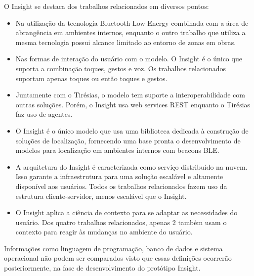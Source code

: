 \documentclass[english,brazilian]{UNISINOSmonografia}
\begin{document}
O Insight se destaca dos trabalhos relacionados em diversos pontos:
\begin{itemize}
	\item Na utilização da tecnologia Bluetooth Low Energy combinada com a área de abrangência em ambientes internos, enquanto o outro trabalho que utiliza a mesma tecnologia possui alcance limitado ao entorno de zonas em obras.

	\item Nas formas de interação do usuário com o modelo. O Insight é o único que suporta a combinação toques, gestos e voz. Os trabalhos relacionados suportam apenas toques ou então toques e gestos.

	\item Juntamente com o Tirésias, o modelo tem suporte a interoperabilidade com outras soluções. Porém, o Insight usa web services REST enquanto o Tirésias faz uso de agentes.

	\item O Insight é o único modelo que usa uma biblioteca dedicada à construção de soluções de localização, fornecendo uma base pronta o desenvolvimento de modelos para localização em ambientes internos com beacons BLE.

	\item A arquitetura do Insight é caracterizada como serviço distribuído na nuvem. Isso garante a infraestrutura para uma solução escalável e altamente disponível aos usuários. Todos os trabalhos relacionados fazem uso da estrutura cliente-servidor, menos escalável que o Insight.

	\item O Insight aplica a ciência de contexto para se adaptar as necessidades do usuário. Dos quatro trabalhos relacionados, apenas 2 também usam o contexto para reagir às mudanças no ambiente do usuário.
\end{itemize}

Informações como linguagem de programação, banco de dados e sistema operacional não podem ser comparados visto que essas definições ocorrerão posteriormente, na fase de desenvolvimento do protótipo Insight.
\end{document}
